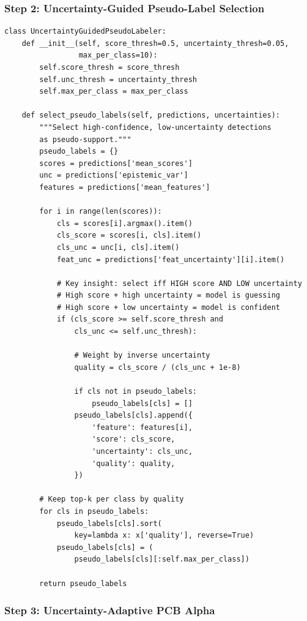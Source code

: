\documentclass[11pt,a4paper]{article}
\begin{document}
\subsubsection{Step 2: Uncertainty-Guided Pseudo-Label Selection}

\begin{lstlisting}[caption={Principled pseudo-label selection}]
class UncertaintyGuidedPseudoLabeler:
    def __init__(self, score_thresh=0.5, uncertainty_thresh=0.05,
                 max_per_class=10):
        self.score_thresh = score_thresh
        self.unc_thresh = uncertainty_thresh
        self.max_per_class = max_per_class

    def select_pseudo_labels(self, predictions, uncertainties):
        """Select high-confidence, low-uncertainty detections
        as pseudo-support."""
        pseudo_labels = {}
        scores = predictions['mean_scores']
        unc = predictions['epistemic_var']
        features = predictions['mean_features']

        for i in range(len(scores)):
            cls = scores[i].argmax().item()
            cls_score = scores[i, cls].item()
            cls_unc = unc[i, cls].item()
            feat_unc = predictions['feat_uncertainty'][i].item()

            # Key insight: select iff HIGH score AND LOW uncertainty
            # High score + high uncertainty = model is guessing
            # High score + low uncertainty = model is confident
            if (cls_score >= self.score_thresh and
                cls_unc <= self.unc_thresh):

                # Weight by inverse uncertainty
                quality = cls_score / (cls_unc + 1e-8)

                if cls not in pseudo_labels:
                    pseudo_labels[cls] = []
                pseudo_labels[cls].append({
                    'feature': features[i],
                    'score': cls_score,
                    'uncertainty': cls_unc,
                    'quality': quality,
                })

        # Keep top-k per class by quality
        for cls in pseudo_labels:
            pseudo_labels[cls].sort(
                key=lambda x: x['quality'], reverse=True)
            pseudo_labels[cls] = (
                pseudo_labels[cls][:self.max_per_class])

        return pseudo_labels
\end{lstlisting}

\subsubsection{Step 3: Uncertainty-Adaptive PCB Alpha}
\end{document}
